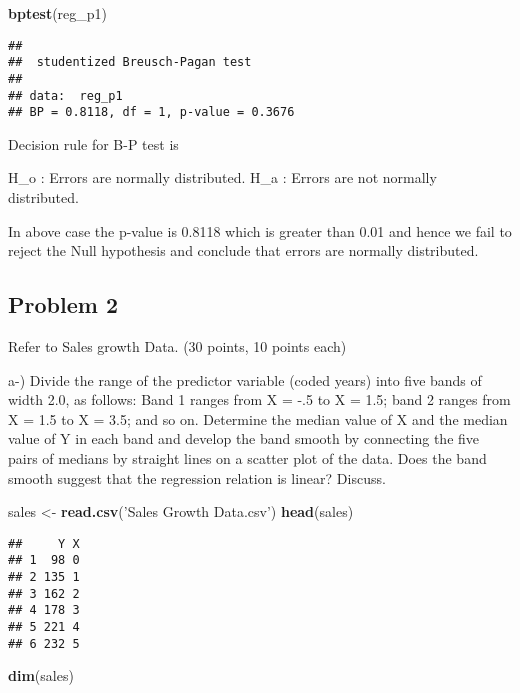 \documentclass[
]{article}
\newenvironment{Shaded}{\begin{snugshade}}{\end{snugshade}}
\newcommand{\KeywordTok}[1]{\textcolor[rgb]{0.13,0.29,0.53}{\textbf{#1}}}
\newcommand{\NormalTok}[1]{#1}
\newcommand{\StringTok}[1]{\textcolor[rgb]{0.31,0.60,0.02}{#1}}
\begin{document}
\begin{Shaded}
\begin{Highlighting}[]
\KeywordTok{bptest}\NormalTok{(reg_p1)}
\end{Highlighting}
\end{Shaded}

\begin{verbatim}
## 
##  studentized Breusch-Pagan test
## 
## data:  reg_p1
## BP = 0.8118, df = 1, p-value = 0.3676
\end{verbatim}

Decision rule for B-P test is

H\_o : Errors are normally distributed. H\_a : Errors are not normally
distributed.

In above case the p-value is 0.8118 which is greater than 0.01 and hence
we fail to reject the Null hypothesis and conclude that errors are
normally distributed.

\hypertarget{problem-2}{%
\subsection{Problem 2}\label{problem-2}}

Refer to Sales growth Data. (30 points, 10 points each)

a-) Divide the range of the predictor variable (coded years) into five
bands of width 2.0, as follows: Band 1 ranges from X = -.5 to X = 1.5;
band 2 ranges from X = 1.5 to X = 3.5; and so on. Determine the median
value of X and the median value of Y in each band and develop the band
smooth by connecting the five pairs of medians by straight lines on a
scatter plot of the data. Does the band smooth suggest that the
regression relation is linear? Discuss.

\begin{Shaded}
\begin{Highlighting}[]
\NormalTok{sales <-}\StringTok{ }\KeywordTok{read.csv}\NormalTok{(}\StringTok{'Sales Growth Data.csv'}\NormalTok{)}
\KeywordTok{head}\NormalTok{(sales)}
\end{Highlighting}
\end{Shaded}

\begin{verbatim}
##     Y X
## 1  98 0
## 2 135 1
## 3 162 2
## 4 178 3
## 5 221 4
## 6 232 5
\end{verbatim}

\begin{Shaded}
\begin{Highlighting}[]
\KeywordTok{dim}\NormalTok{(sales)}
\end{Highlighting}
\end{Shaded}
\end{document}
